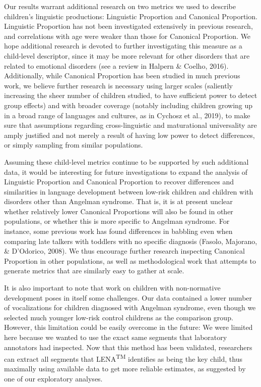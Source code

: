 \documentclass[english,,man]{apa6}
\begin{document}
Our results warrant additional research on two metrics we used to describe children's linguistic productions: Linguistic Proportion and Canonical Proportion. Linguistic Proportion has not been investigated extensively in previous research, and correlations with age were weaker than those for Canonical Proportion. We hope additional research is devoted to further investigating this measure as a child-level descriptor, since it may be more relevant for other disorders that are related to emotional disorders (see a review in Halpern \& Coelho, 2016). Additionally, while Canonical Proportion has been studied in much previous work, we believe further research is necessary using larger scales (saliently increasing the sheer number of children studied, to have sufficient power to detect group effects) and with broader coverage (notably including children growing up in a broad range of languages and cultures, as in Cychosz et al., 2019), to make sure that assumptions regarding cross-linguistic and maturational universality are amply justified and not merely a result of having low power to detect differences, or simply sampling from similar populations.

Assuming these child-level metrics continue to be supported by such additional data, it would be interesting for future investigations to expand the analysis of Linguistic Proportion and Canonical Proportion to recover differences and similarities in language development between low-risk children and children with disorders other than Angelman syndrome. That is, it is at present unclear whether relatively lower Canonical Proportions will also be found in other populations, or whether this is more specific to Angelman syndrome. For instance, some previous work has found differences in babbling even when comparing late talkers with toddlers with no specific diagnosis (Fasolo, Majorano, \& D'Odorico, 2008). We thus encourage further research inspecting Canonical Proportion in other populations, as well as methodological work that attempts to generate metrics that are similarly easy to gather at scale.

It is also important to note that work on children with non-normative development poses in itself some challenges. Our data contained a lower number of vocalizations for children diagnosed with Angelman syndrome, even though we selected much younger low-risk control childrens as the comparison group. However, this limitation could be easily overcome in the future: We were limited here because we wanted to use the exact same segments that laboratory annotators had inspected. Now that this method has been validated, researchers can extract all segments that LENA\textsuperscript{TM} identifies as being the key child, thus maximally using available data to get more reliable estimates, as suggested by one of our exploratory analyses.
\end{document}
